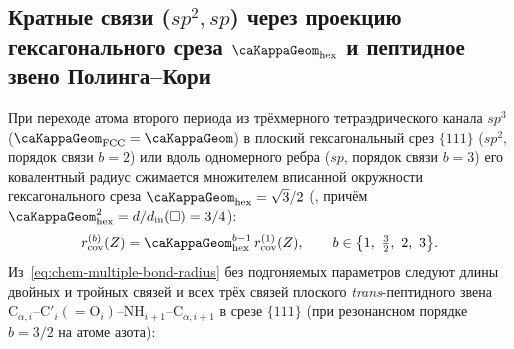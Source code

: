 \subsection{Кратные связи (\texorpdfstring{$sp^2, sp$}{sp2, sp}) через проекцию гексагонального среза \texorpdfstring{$\caKappaGeom_{\mathrm{hex}}$}{kappa\_hex} и пептидное звено Полинга--Кори}
\label{sec:chem-multiple-bonds}

При переходе атома второго периода из трёхмерного тетраэдрического канала $sp^3$ ($\caKappaGeom_{\mathrm{FCC}}=\caKappaGeom$) в плоский гексагональный срез $\{111\}$ ($sp^2$, порядок связи $b=2$) или вдоль одномерного ребра ($sp$, порядок связи $b=3$) его ковалентный радиус сжимается множителем вписанной окружности гексагонального среза $\caKappaGeom_{\mathrm{hex}}=\sqrt{3}/2$ (, причём $\caKappaGeom_{\mathrm{hex}}^2 = d/d_{\mathrm{in}}(\square) = 3/4$):
\begin{equation}
\label{eq:chem-multiple-bond-radius}
  r_{\mathrm{cov}}^{(b)}(Z) = \caKappaGeom_{\mathrm{hex}}^{b-1}\,r_{\mathrm{cov}}^{(1)}(Z),
  \qquad b\in\bigl\{1,\ \tfrac{3}{2},\ 2,\ 3\bigr\}.
\end{equation}
Из~\eqref{eq:chem-multiple-bond-radius} без подгоняемых параметров следуют длины двойных и тройных связей и всех трёх связей плоского \emph{trans}-пептидного звена $\text{C}_{\alpha,i}\text{--C}'_i(=\text{O}_i)\text{--NH}_{i+1}\text{--C}_{\alpha,i+1}$ в срезе $\{111\}$ (при резонансном порядке $b=3/2$ на атоме азота):
